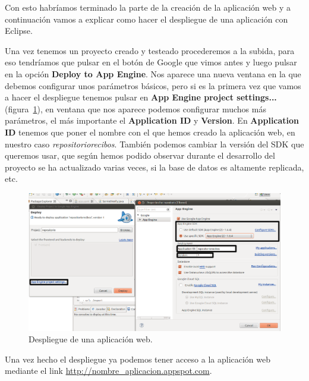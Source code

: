 Con esto habríamos terminado la parte de la creación de la aplicación web y a continuación vamos a explicar como hacer el despliegue de una aplicación con Eclipse.

Una vez tenemos un proyecto creado y testeado procederemos a la subida, para eso tendríamos que pulsar en el botón de Google que vimos antes y luego pulsar en la opción \textbf{Deploy to App Engine}. Nos aparece una nueva ventana en la que debemos configurar unos parámetros básicos, pero si es la primera vez que vamos a hacer el despliegue tenemos pulsar en \textbf{App Engine project settings...} (figura~\ref{fig:GAESettings}), en ventana que nos aparece podemos configurar muchos más parámetros, el más importante el \textbf{Application ID} y \textbf{Version}. En \textbf{Application ID} tenemos que poner el nombre con el que hemos creado la aplicación web, en nuestro caso \textit{repositoriorecibos}. También podemos cambiar la versión del SDK que queremos usar, que según hemos podido observar durante el desarrollo del proyecto se ha actualizado varias veces, si la base de datos es altamente replicada, etc.

\begin{figure}
  \centering
    \includegraphics[scale=0.6]{./ConfiguracionEclipse/imagenes/GAESettings.png}
  \caption{Despliegue de una aplicación web.}
  \label{fig:GAESettings}
\end{figure}

Una vez hecho el despliegue ya podemos tener acceso a la aplicación web mediante el link \url{http://nombre\_aplicacion.appspot.com}.






















